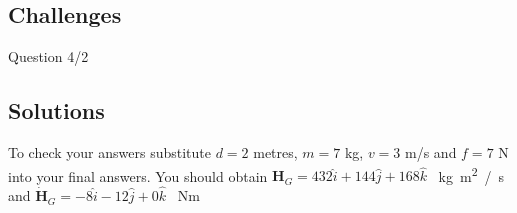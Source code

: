 \subsection*{Challenges}
Question 4/2

\subsection*{Solutions}
To check your answers substitute $d=2$ metres, $m=7$ kg, $v=3$ m/s and $f=7$ N into your final answers.
You should obtain
$\bm{H}_G = 432 \hat{i} + 144 \hat{j} + 168 \hat{k}$ \SI{}{kg m^2 /s}
and
$\dot{\bm{H}}_G = -8 \hat{i} - 12 \hat{j} + 0 \hat{k}$ \SI{}{Nm}




%
%
%
%
%
%
%




